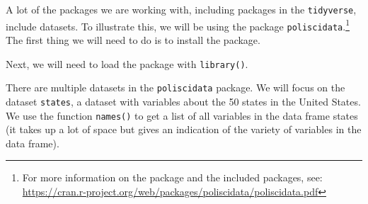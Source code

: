 \documentclass[12pt,oneside]{reedthesis}
\theoremstyle{definition}
\theoremstyle{definition}
\theoremstyle{definition}
\theoremstyle{remark}
\begin{document}
  A lot of the packages we are working with, including packages in the
  \texttt{tidyverse}, include datasets. To illustrate this, we will be
  using the package \texttt{poliscidata}.\footnote{For more information on
    the package and the included packages, see:
    \url{https://cran.r-project.org/web/packages/poliscidata/poliscidata.pdf}}
  The first thing we will need to do is to install the package.
  \begin{Shaded}
  \begin{Highlighting}[]
  \NormalTok{(}\NormalTok{)}
  \end{Highlighting}
  \end{Shaded}
  Next, we will need to load the package with \texttt{library()}.
  \begin{Shaded}
  \begin{Highlighting}[]
  \NormalTok{(}\NormalTok{)}
  \end{Highlighting}
  \end{Shaded}
  There are multiple datasets in the \texttt{poliscidata} package. We will
  focus on the dataset \texttt{states}, a dataset with variables about the
  50 states in the United States. We use the function \texttt{names()} to
  get a list of all variables in the data frame states (it takes up a lot
  of space but gives an indication of the variety of variables in the data
  frame).
  \begin{Shaded}
  \begin{Highlighting}[]
  \end{Highlighting}
  \end{Shaded}
\end{document}

